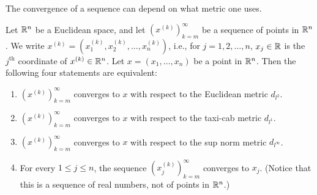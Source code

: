 \begin{note}
  The convergence of a sequence can depend on what metric one uses.
\end{note}

\setcounter{thm}{17}
\begin{prop}\label{1.1.18}
  Let \(\mathbb{R}^n\) be a Euclidean space, and let \((x^{(k)})_{k = m}^\infty\) be a sequence of points in \(\mathbb{R}^n\).
  We write \(x^{(k)} = (x_1^{(k)}, x_2^{(k)}, \dots, x_n^{(k)})\), i.e., for \(j = 1, 2, \dots, n\), \(x_j \in \mathbb{R}\) is the \(j^{\text{th}}\) coordinate of \(x^{(k)} \in \mathbb{R}^n\).
  Let \(x = (x_1, \dots, x_n)\) be a point in \(\mathbb{R}^n\).
  Then the following four statements are equivalent:
  \begin{enumerate}
    \item \((x^{(k)})_{k = m}^\infty\) converges to \(x\) with respect to the Euclidean metric \(d_{l^2}\).
    \item \((x^{(k)})_{k = m}^\infty\) converges to \(x\) with respect to the taxi-cab metric \(d_{l^1}\).
    \item \((x^{(k)})_{k = m}^\infty\) converges to \(x\) with respect to the sup norm metric \(d_{l^\infty}\).
    \item For every \(1 \leq j \leq n\), the sequence \((x_j^{(k)})_{k = m}^\infty\) converges to \(x_j\).
          (Notice that this is a sequence of real numbers, not of points in \(\mathbb{R}^n\).)
  \end{enumerate}
\end{prop}


